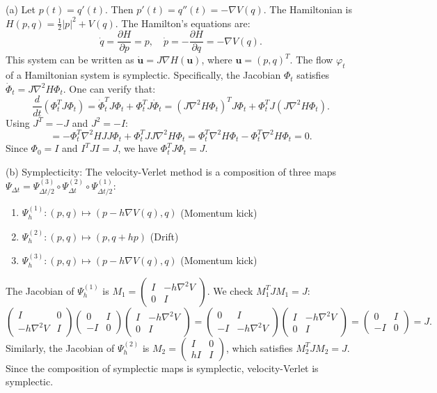 \begin{solution}
(a) Let $p(t) = q'(t)$. Then $p'(t) = q''(t) = -\nabla V(q)$. The Hamiltonian is $H(p, q) = \frac{1}{2} |p|^2 + V(q)$. The Hamilton's equations are:
\[
\dot{q} = \frac{\partial H}{\partial p} = p, \quad \dot{p} = -\frac{\partial H}{\partial q} = -\nabla V(q).
\]
This system can be written as $\dot{\mathbf{u}} = J \nabla H(\mathbf{u})$, where $\mathbf{u} = (p, q)^T$. The flow $\varphi_t$ of a Hamiltonian system is symplectic. Specifically, the Jacobian $\Phi_t$ satisfies $\dot{\Phi}_t = J \nabla^2 H \Phi_t$. One can verify that:
\[
\frac{d}{dt} (\Phi_t^T J \Phi_t) = \dot{\Phi}_t^T J \Phi_t + \Phi_t^T J \dot{\Phi}_t = (J \nabla^2 H \Phi_t)^T J \Phi_t + \Phi_t^T J (J \nabla^2 H \Phi_t).
\]
Using $J^T = -J$ and $J^2 = -I$:
\[
= -\Phi_t^T \nabla^2 H J J \Phi_t + \Phi_t^T J J \nabla^2 H \Phi_t = \Phi_t^T \nabla^2 H \Phi_t - \Phi_t^T \nabla^2 H \Phi_t = 0.
\]
Since $\Phi_0 = I$ and $I^T J I = J$, we have $\Phi_t^T J \Phi_t = J$.

(b) Symplecticity: The velocity-Verlet method is a composition of three maps $\Psi_{\Delta t} = \Psi^{(3)}_{\Delta t/2} \circ \Psi^{(2)}_{\Delta t} \circ \Psi^{(1)}_{\Delta t/2}$:
\begin{enumerate}
    \item $\Psi^{(1)}_{h}: (p, q) \mapsto (p - h\nabla V(q), q)$ (Momentum kick)
    \item $\Psi^{(2)}_{h}: (p, q) \mapsto (p, q + hp)$ (Drift)
    \item $\Psi^{(3)}_{h}: (p, q) \mapsto (p - h\nabla V(q), q)$ (Momentum kick)
\end{enumerate}
The Jacobian of $\Psi^{(1)}_h$ is $M_1 = \begin{pmatrix} I & -h\nabla^2 V \\ 0 & I \end{pmatrix}$. We check $M_1^T J M_1 = J$:
\[
\begin{pmatrix} I & 0 \\ -h\nabla^2 V & I \end{pmatrix} \begin{pmatrix} 0 & I \\ -I & 0 \end{pmatrix} \begin{pmatrix} I & -h\nabla^2 V \\ 0 & I \end{pmatrix} = \begin{pmatrix} 0 & I \\ -I & -h\nabla^2 V \end{pmatrix} \begin{pmatrix} I & -h\nabla^2 V \\ 0 & I \end{pmatrix} = \begin{pmatrix} 0 & I \\ -I & 0 \end{pmatrix} = J.
\]
Similarly, the Jacobian of $\Psi^{(2)}_h$ is $M_2 = \begin{pmatrix} I & 0 \\ hI & I \end{pmatrix}$, which satisfies $M_2^T J M_2 = J$. Since the composition of symplectic maps is symplectic, velocity-Verlet is symplectic.


\end{solution}
